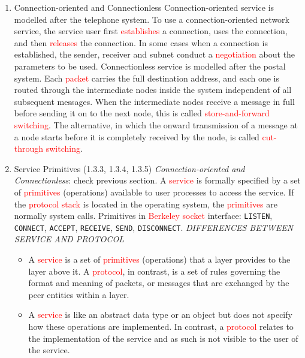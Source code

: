 \documentclass[a4paper,10pt]{article}
\newcommand{\red}[1]{\textcolor{red}{#1}}
\begin{document}
\begin{enumerate}
  \item Connection-oriented and Connectionless
    \newline Connection-oriented service is modelled after the telephone system. To use a connection-oriented network service, the service user first \red{establishes} a connection, uses the connection, and then \red{releases} the connection. In some cases when a connection is established, the sender, receiver and subnet conduct a \red{negotiation} about the parameters to be used.
    \newline Connectionless service is modelled after the postal system. Each \red{packet} carries the full destination address, and each one is routed through the intermediate nodes inside the system independent of all subsequent messages. When the intermediate nodes receive a message in full before sending it on to the next node, this is called \red{store-and-forward switching}. The alternative, in which the onward transmission of a message at a node starts before it is completely received by the node, is called \red{cut-through switching}.
  
  \item Service Primitives (1.3.3, 1.3.4, 1.3.5)
    \newline\textit{Connection-oriented and Connectionless}: check previous section.
    \newline
    \newline A \red{service} is formally specified by a set of \red{primitives} (operations) available to user processes to access the service. If the \red{protocol stack} is located in the operating system, the \red{primitives} are normally system calls.
    \newline
    \newline Primitives in \red{Berkeley socket} interface: \texttt{LISTEN}, \texttt{CONNECT}, \texttt{ACCEPT}, \texttt{RECEIVE}, \texttt{SEND}, \texttt{DISCONNECT}.
    \newline
    \newline\textit{DIFFERENCES BETWEEN SERVICE AND PROTOCOL}
    \begin{itemize}
      \item A \red{service} is a set of \red{primitives} (operations) that a layer provides to the layer above it. A \red{protocol}, in contrast, is a set of rules governing the format and meaning of packets, or messages that are exchanged by the peer entities within a layer.
      \item A \red{service} is like an abstract data type or an object but does not specify how these operations are implemented. In contrast, a \red{protocol} relates to the implementation of the service and as such is not visible to the user of the service.
    \end{itemize}
  

\end{enumerate}
\end{document}
